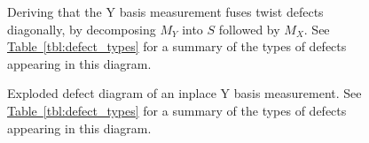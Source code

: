 \documentclass[onecolumn,unpublished,a4paper]{quantumarticle}
\theoremstyle{definition}
\theoremstyle{definition}
\theoremstyle{definition}
\newcommand{\tbl}[1]{\hyperref[tbl:#1]{Table~\ref*{tbl:#1}}}
\begin{document}
\begin{figure}
    \centering
    \caption{
        Deriving that the Y basis measurement fuses twist defects diagonally, by decomposing $M_Y$ into $S$ followed by $M_X$.
        See \tbl{defect_types} for a summary of the types of defects appearing in this diagram.
    }
    \label{fig:topological_decomposition}
\end{figure}

\begin{figure}
    \centering
    \caption{
        Exploded defect diagram of an inplace Y basis measurement.
        See \tbl{defect_types} for a summary of the types of defects appearing in this diagram.
    }
    \label{fig:topological_explosion}
\end{figure}
\end{document}
